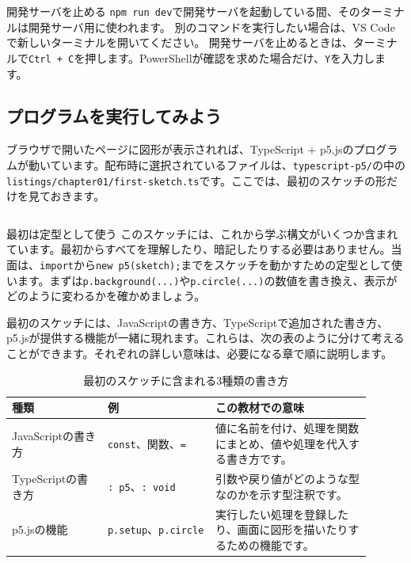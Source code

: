 \begin{notebox}{開発サーバを止める}
\texttt{npm run dev}で開発サーバを起動している間、そのターミナルは開発サーバ用に使われます。
別のコマンドを実行したい場合は、VS Codeで新しいターミナルを開いてください。
開発サーバを止めるときは、ターミナルで\texttt{Ctrl + C}を押します。PowerShellが確認を求めた場合だけ、\texttt{Y}を入力します。
\end{notebox}

\subsection{プログラムを実行してみよう}

ブラウザで開いたページに図形が表示されれば、TypeScript + p5.jsのプログラムが動いています。配布時に選択されているファイルは、\texttt{typescript-p5/}の中の\texttt{listings/chapter01/first-sketch.ts}です。ここでは、最初のスケッチの形だけを見ておきます。


\begin{listing}[htbp]
\inputminted{ts}{typescript-p5/listings/chapter01/first-sketch.ts}
\caption{最初のp5.jsスケッチ（\texttt{chapter01/first-sketch.ts}）}
\label{lst:chapter01-first-sketch}
\end{listing}

\begin{pointbox}{最初は定型として使う}
このスケッチには、これから学ぶ構文がいくつか含まれています。最初からすべてを理解したり、暗記したりする必要はありません。当面は、\texttt{import}から\texttt{new p5(sketch);}までをスケッチを動かすための定型として使います。まずは\texttt{p.background(...)}や\texttt{p.circle(...)}の数値を書き換え、表示がどのように変わるかを確かめましょう。
\end{pointbox}

最初のスケッチには、JavaScriptの書き方、TypeScriptで追加された書き方、p5.jsが提供する機能が一緒に現れます。これらは、次の表のように分けて考えることができます。それぞれの詳しい意味は、必要になる章で順に説明します。

\begin{table}[htbp]
    \centering
    \caption{最初のスケッチに含まれる3種類の書き方}
    \label{tab:chapter01-javascript-typescript-p5}
    \begin{tabular}{p{0.24\linewidth}p{0.27\linewidth}p{0.39\linewidth}}
        \toprule
        種類 & 例 & この教材での意味 \\
        \midrule
        JavaScriptの書き方
            & \texttt{const}、関数、\texttt{=}
            & 値に名前を付け、処理を関数にまとめ、値や処理を代入する書き方です。 \\
        TypeScriptの書き方
            & \texttt{: p5}、\texttt{: void}
            & 引数や戻り値がどのような型なのかを示す型注釈です。 \\
        p5.jsの機能
            & \texttt{p.setup}、\texttt{p.circle}
            & 実行したい処理を登録したり、画面に図形を描いたりするための機能です。 \\
        \bottomrule
    \end{tabular}
\end{table}

